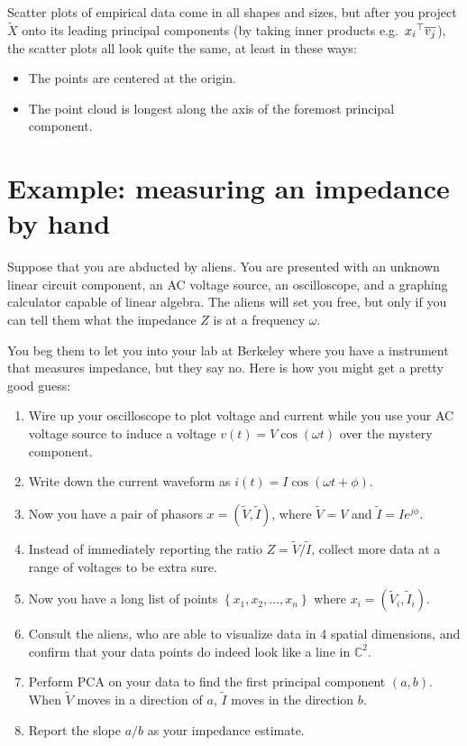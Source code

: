 Scatter plots of empirical data come in all shapes and sizes, but after you project
\(\widetilde X\) onto its leading principal components (by taking inner products e.g.~\({x_i}^\top\overline{v_j}\)), the scatter plots all look quite the same, at least in these ways:
\begin{itemize}
  \item The points are centered at the origin.
  \item The point cloud is longest along the axis of the foremost principal component.
\end{itemize}

\section{Example: measuring an impedance by hand}
Suppose that you are abducted by aliens.
You are presented with an unknown linear circuit component, an AC voltage source, an oscilloscope, and a graphing calculator capable of linear algebra.
The aliens will set you free, but only if you can tell them what the impedance \(Z\) is at a frequency \(\omega\).

You beg them to let you into your lab at Berkeley where you have a instrument that measures impedance, but they say no.
Here is how you might get a pretty good guess:

\begin{enumerate}
  \item Wire up your oscilloscope to plot voltage and current while you use your AC voltage source to induce a voltage \(v(t) = V \cos(\omega t)\) over the mystery component.
  \item Write down the current waveform as \(i(t) = I \cos({\omega t + \phi})\).
  \item Now you have a pair of phasors \(x = (\tilde V, \tilde I)\), where \(\tilde V = V\) and \(\tilde I = I e^{j \phi}\).
  \item Instead of immediately reporting the ratio \(Z = \tilde V / \tilde I\),
   collect more data at a range of voltages to be extra sure.
  \item Now you have a long list of points \(\left\{x_1, x_2, \ldots, x_n\right\}\) where \(x_i = (\tilde V_i, \tilde I_i)\).
  \item Consult the aliens, who are able to visualize data in 4 spatial dimensions, and confirm that your data points do indeed look like a line in \(\mathbb{C}^2\).
  \item Perform PCA on your data to find the first principal component \((a, b)\).
  When \(\tilde V\) moves in a direction of \(a\), \(\tilde I\) moves in the direction \(b\).
  \item Report the slope \(a/b\) as your impedance estimate.
\end{enumerate}
